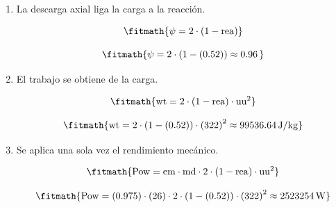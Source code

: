 \begin{enumerate}

\item La descarga axial liga la carga a la reacción.

\[\fitmath{\psi=2\cdot \left(1-\mathrm{rea}\right)}\]

\[\fitmath{\psi=2\cdot \left(1-(0.52)\right)\approx 0.96\,}\]

\item El trabajo se obtiene de la carga.

\[\fitmath{\mathrm{wt}=2\cdot \left(1-\mathrm{rea}\right)\cdot {\mathrm{uu}}^{2}}\]

\[\fitmath{\mathrm{wt}=2\cdot \left(1-(0.52)\right)\cdot {(322)}^{2}\approx 99536.64\,\mathrm{J/kg}}\]

\item Se aplica una sola vez el rendimiento mecánico.

\[\fitmath{\mathrm{Pow}=\mathrm{em}\cdot \mathrm{md}\cdot 2\cdot \left(1-\mathrm{rea}\right)\cdot {\mathrm{uu}}^{2}}\]

\[\fitmath{\mathrm{Pow}=(0.975)\cdot (26)\cdot 2\cdot \left(1-(0.52)\right)\cdot {(322)}^{2}\approx 2523254\,\mathrm{W}}\]

\end{enumerate}
